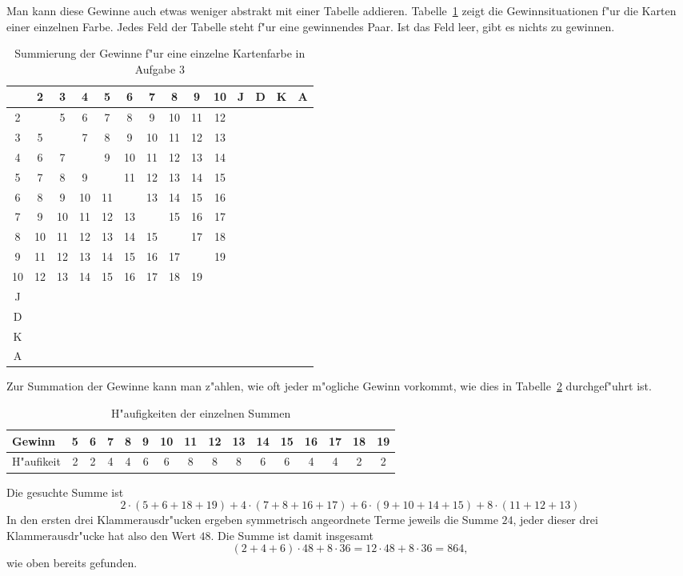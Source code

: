 \begin{loesung}
\begin{teilaufgaben}
Man kann diese Gewinne auch etwas weniger abstrakt mit einer Tabelle
addieren. Tabelle~\ref{tabelle} zeigt die Gewinnsituationen f"ur die
Karten einer einzelnen Farbe. Jedes Feld der Tabelle steht f"ur eine gewinnendes
Paar. Ist das Feld leer, gibt es nichts zu gewinnen.
\begin{table}
\begin{center}
\begin{tabular}{c|c|c|c|c|c|c|c|c|c|c|c|c|c|}
  & 2& 3& 4& 5& 6& 7& 8& 9&10& J& D& K& A\\
\hline
2 &  & 5& 6& 7& 8& 9&10&11&12&  &  &  &  \\
3 & 5&  & 7& 8& 9&10&11&12&13&  &  &  &  \\
4 & 6& 7&  & 9&10&11&12&13&14&  &  &  &  \\
5 & 7& 8& 9&  &11&12&13&14&15&  &  &  &  \\
6 & 8& 9&10&11&  &13&14&15&16&  &  &  &  \\
7 & 9&10&11&12&13&  &15&16&17&  &  &  &  \\
8 &10&11&12&13&14&15&  &17&18&  &  &  &  \\
9 &11&12&13&14&15&16&17&  &19&  &  &  &  \\
10&12&13&14&15&16&17&18&19&  &  &  &  &  \\
J &  &  &  &  &  &  &  &  &  &  &  &  &  \\
D &  &  &  &  &  &  &  &  &  &  &  &  &  \\
K &  &  &  &  &  &  &  &  &  &  &  &  &  \\
A &  &  &  &  &  &  &  &  &  &  &  &  &  \\
\hline
\end{tabular}
\end{center}
\caption{Summierung der Gewinne f"ur eine einzelne Kartenfarbe
in Aufgabe 3\label{tabelle}}
\end{table}
Zur Summation der Gewinne kann man z"ahlen, wie oft jeder
m"ogliche Gewinn vorkommt, wie dies in Tabelle~\ref{haeufigkeiten}
durchgef"uhrt ist.
\begin{table}
\begin{center}
\begin{tabular}{|l|c|c|c|c|c|c|c|c|c|c|c|c|c|c|c|}
\hline
Gewinn    &5&6&7&8&9&10&11&12&13&14&15&16&17&18&19\\
\hline
H"aufikeit&2&2&4&4&6& 6& 8& 8& 8& 6& 6& 4& 4& 2& 2\\
\hline
\end{tabular}
\end{center}
\caption{H"aufigkeiten der einzelnen Summen\label{haeufigkeiten}}
\end{table}
Die gesuchte Summe ist
\[
2\cdot(5+6+18+19)
+
4\cdot(7+8+16+17)
+
6\cdot(9+10+14+15)
+
8\cdot(11+12+13)
\]
In den ersten drei Klammerausdr"ucken ergeben symmetrisch
angeordnete Terme jeweils die Summe $24$, jeder dieser
drei Klammerausdr"ucke hat also den Wert $48$. Die Summe ist
damit insgesamt
\[
(2+4+6)\cdot 48+8\cdot 36=12\cdot 48+8\cdot 36
=
864,
\]
wie oben bereits gefunden.


\end{teilaufgaben}
\end{loesung}
